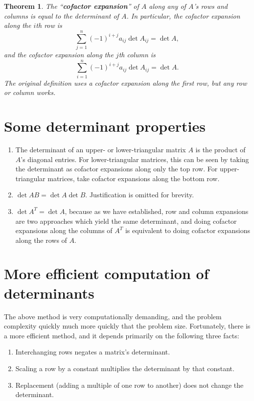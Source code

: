 \documentclass[draft,12pt]{report}
\newtheorem{theorem}{Theorem}
\begin{document}
\begin{theorem}
    The ``\textbf{cofactor expansion}'' of $A$ along any of $A$'s rows and columns is equal to the determinant of $A$. In particular, the cofactor expansion along the $i$th row is
    \begin{equation*}
        \sum_{j=1}^n (-1)^{i+j}a_{ij} \det A_{ij} = \det A,
    \end{equation*}
    and the cofactor expansion along the $j$th column is
    \begin{equation*}
        \sum_{i=1}^n (-1)^{i+j}a_{ij} \det A_{ij} = \det A.
    \end{equation*}
    The original definition uses a cofactor expansion along the first row, but any row or column works.
\end{theorem}

\section{Some determinant properties}

\begin{enumerate}
    \item The determinant of an upper- or lower-triangular matrix $A$ is the product of $A$'s diagonal entries. For lower-triangular matrices, this can be seen by taking the determinant as cofactor expansions along only the top row. For upper-triangular matrices, take cofactor expansions along the bottom row.
    \item $\det AB = \det A \det B$. Justification is omitted for brevity.
    \item $\det A^T = \det A$, because as we have established, row and column expansions are two approaches which yield the same determinant, and doing cofactor expansions along the columns of $A^T$ is equivalent to doing cofactor expansions along the rows of $A$.
\end{enumerate}

\section{More efficient computation of determinants}

The above method is very computationally demanding, and the problem complexity quickly much more quickly that the problem size. Fortunately, there is a more efficient method, and it depends primarily on the following three facts:
\begin{enumerate}
    \item Interchanging rows negates a matrix's determinant.
    \item Scaling a row by a constant multiplies the determinant by that constant.
    \item Replacement (adding a multiple of one row to another) does not change the determinant.
\end{enumerate}
\end{document}
